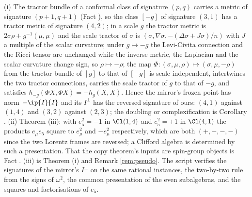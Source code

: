 (i) The tractor bundle of a conformal class of signature $(p,q)$ carries a metric of signature $(p+1,q+1)$ (Fact ), so the class $[-g]$ of signature $(3,1)$ has a tractor metric of signature $(4,2)$; in a scale $g$ the tractor metric is $2\sigma\rho + g^{-1}(\mu,\mu)$ and the scale tractor of $\sigma$ is $(\sigma, \nabla\sigma, -(\Delta\sigma + J\sigma)/n)$ with $J$ a multiple of the scalar curvature; under $g \mapsto -g$ the Levi-Civita connection and the Ricci tensor are unchanged while the inverse metric, the Laplacian and the scalar curvature change sign, so $\rho \mapsto -\rho$; the map $\Phi: (\sigma, \mu, \rho) \mapsto (\sigma, \mu, -\rho)$ from the tractor bundle of $[g]$ to that of $[-g]$ is scale-independent, intertwines the two tractor connections, carries the scale tractor of $g$ to that of $-g$, and satisfies $h_{-g}(\Phi X, \Phi X) = -h_{g}(X, X)$. Hence the mirror's frozen point has norm $-\ip{I}{I}$ and its $I^{\perp}$ has the reversed signature of ours: $(4,1)$ against $(1,4)$ and $(3,2)$ against $(2,3)$; the doubling or complexification is Corollary . (ii) Theorem (iii): with $e_{5}^{2} = -1$ in $\Cl(1,4)$ and $e_{5}^{2} = +1$ in $\Cl(4,1)$ the products $e_{\mu}e_{5}$ square to $e_{\mu}^{2}$ and $-e_{\mu}^{2}$ respectively, which are both $(+,-,-,-)$ since the two Lorentz frames are reversed; a Clifford algebra is determined by such a presentation. That the copy theorem's inputs are spin-group objects is Fact . (iii) is Theorem (i) and Remark \ref{rem:pseudo}. The script verifies the signatures of the mirror's $I^{\perp}$ on the same rational instances, the two-by-two rule from the signs of $\omega^{2}$, the common presentation of the even subalgebras, and the squares and factorisations of $e_{5}$.

